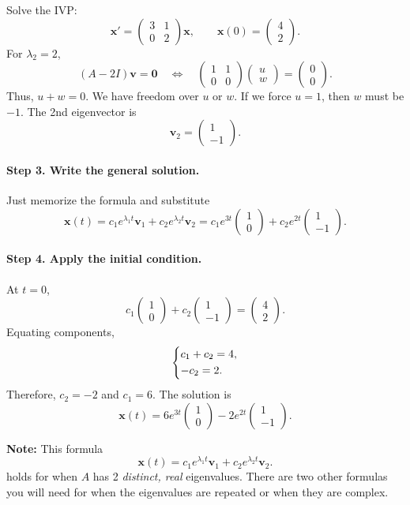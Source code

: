 \documentclass[10pt,letterpaper]{article}
\begin{document}
\begin{example}[6]{
Solve the IVP:
\[
\mathbf{x}'=
\begin{pmatrix}
3&1\\
0&2
\end{pmatrix}\mathbf{x},
\qquad
\mathbf{x}(0)=\begin{pmatrix}4\\2\end{pmatrix}.
\]
}
For $\lambda_2=2$,
\[
(A-2I)\mathbf{v}=\mathbf{0}
\quad\Longleftrightarrow\quad
\begin{pmatrix}
1&1\\
0&0
\end{pmatrix}
\begin{pmatrix}u\\w\end{pmatrix}
=\begin{pmatrix}0\\0\end{pmatrix}.
\]
Thus, $u+w=0$. We have freedom over $u$ or $w$. If we force $u=1$, then $w$ must be $-1$. The 2nd eigenvector is
\[
\mathbf{v}_2=\begin{pmatrix}1\\-1\end{pmatrix}.
\]

\paragraph{Step 3. Write the general solution.} Just memorize the formula and substitute
\[
\mathbf{x}(t)=c_1e^{\lambda_1t}\mathbf{v}_1 +c_2e^{\lambda_2t}\mathbf{v}_2
=c_1e^{3t}\begin{pmatrix}1\\0\end{pmatrix}
+c_2e^{2t}\begin{pmatrix}1\\-1\end{pmatrix}.
\]

\paragraph{Step 4. Apply the initial condition.}
At $t=0$,
\[
c_1\begin{pmatrix}1\\0\end{pmatrix}
+c_2\begin{pmatrix}1\\-1\end{pmatrix}
=\begin{pmatrix}4\\2\end{pmatrix}.
\]
Equating components,
\[
\begin{dcases}
c_1+c_2=4,\\
-c_2=2.
\end{dcases}
\]
Therefore, $c_2=-2$ and $c_1=6$. The solution is
\[
\boxed{
\mathbf{x}(t)
=6e^{3t}\begin{pmatrix}1\\0\end{pmatrix}
-2e^{2t}\begin{pmatrix}1\\-1\end{pmatrix}.
}
\]
\end{example}

\textbf{Note:} This formula 
$$
\mathbf{x}(t)
=c_1e^{\lambda_1t}\mathbf{v}_1
+c_2e^{\lambda_2t}\mathbf{v}_2.
$$
holds for when $A$ has 2 \textit{distinct, real} eigenvalues. There are two other formulas you will need for when the eigenvalues are repeated or when they are complex.
\end{document}
